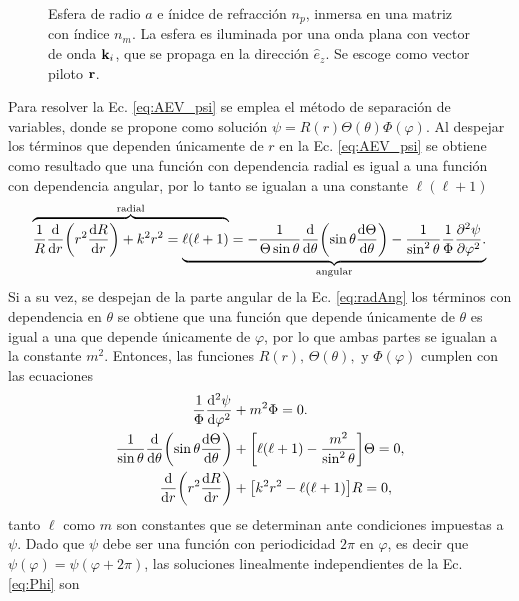 \begin{figure}[h!]
		\caption{ Esfera de radio $a$ e ínidce de refracción $n_p$, inmersa en una matriz con índice $n_m$. La esfera es iluminada por una onda plana con vector de onda $\vb{k}_i$, que se propaga en la dirección $\hat{e}_z$. Se escoge como vector piloto $\vb{r}$.}\label{fig:EsferaA}
	\end{figure}	
	
Para resolver la Ec. \eqref{eq:AEV_psi} se emplea el método de separación de variables, donde se propone como solución $\psi= R(r)\Theta(\theta) \Phi(\varphi)$. Al despejar los términos que dependen únicamente de $r$ en la Ec. \eqref{eq:AEV_psi} se obtiene como resultado que una función con dependencia radial es igual a una función con dependencia angular, por lo tanto se igualan a una constante $\ell (\ell +1)$
	\begin{align}
\mathrlap{\overbrace{\phantom{\frac{1}{R} \dv{r}\qty(r^2\dv{R}{r})+  k^2 r^2 = \ell (\ell +1)}}^{\text{radial}}}
							 \frac{1}{R} \dv{r}\qty(r^2\dv{R}{r})+  k^2 r^2 = 
\mathrlap{\underbrace{\phantom{\ell (\ell +1)=
											-\frac{1}{\Theta\sin\theta}\dv{\theta}\qty(\sin\theta\dv{\Theta}{\theta})
								 			- \frac{1}{\sin^2\theta}\frac{1}{\Phi}\pdv[2]{\psi}{\varphi}. }}_{\text{angular}}}
						 	\ell (\ell +1)=
											-\frac{1}{\Theta\sin\theta}\dv{\theta}\qty(\sin\theta\dv{\Theta}{\theta})
					 						- \frac{1}{\sin^2\theta}\frac{1}{\Phi}\pdv[2]{\psi}{\varphi}.
					 		\label{eq:radAng}
	\end{align}
Si a su vez, se despejan de la parte angular de la Ec. \eqref{eq:radAng} los términos con dependencia en $\theta$ se obtiene que una función que depende únicamente de $\theta$ es igual a una que depende únicamente de $\varphi$, por lo que ambas partes se igualan a la constante $m^2$. Entonces, las funciones $R(r),\, \Theta(\theta), \mbox{ y } \Phi(\varphi)$ cumplen con las ecuaciones
\begin{align}
\frac{1}{\Phi}\dv[2]{\psi}{\varphi} &+ m^2 \Phi =0. \label{eq:Phi}\\
\frac{1}{\sin\theta}\dv{\theta}\qty(\sin\theta\dv{\Theta}{\theta}) &+ \qty[\ell(\ell+1)- \frac{m^2}{\sin^2\theta}]\Theta =0,\label{eq:Theta}\\
\dv{r}\qty(r^2\dv{R}{r}) &+ \qty[ k^2 r^2 - \ell (\ell +1)] R =0, \label{eq:R}
\end{align}
tanto $\ell$  como $m$ son constantes que se determinan ante condiciones impuestas a $\psi$. Dado que $\psi$ debe ser una función con periodicidad $2\pi$ en $\varphi$, es decir que $\psi(\varphi) = \psi(\varphi+2\pi)$, las soluciones linealmente independientes de la Ec. \eqref{eq:Phi} son 

